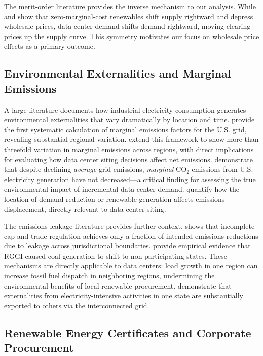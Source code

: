 \documentclass[a4paper,fleqn,longmktitle]{cas-sc}
\begin{document}
The merit-order literature provides the inverse mechanism to our analysis. While \citet{sensfuss2008} and \citet{cludius2014} show that zero-marginal-cost renewables shift supply rightward and depress wholesale prices, data center demand shifts demand rightward, moving clearing prices up the supply curve. This symmetry motivates our focus on wholesale price effects as a primary outcome.
 
\subsection{Environmental Externalities and Marginal Emissions}
 
A large literature documents how industrial electricity consumption generates environmental externalities that vary dramatically by location and time. \citet{siler_evans2012} provide the first systematic calculation of marginal emissions factors for the U.S. grid, revealing substantial regional variation. \citet{graff_zivin2014} extend this framework to show more than threefold variation in marginal emissions across regions, with direct implications for evaluating how data center siting decisions affect net emissions. \citet{holland2022pnas} demonstrate that despite declining \emph{average} grid emissions, \emph{marginal} CO$_2$ emissions from U.S. electricity generation have not decreased---a critical finding for assessing the true environmental impact of incremental data center demand. \citet{callaway_fowlie2018} quantify how the location of demand reduction or renewable generation affects emissions displacement, directly relevant to data center siting.
 
The emissions leakage literature provides further context. \citet{fowlie2009} shows that incomplete cap-and-trade regulation achieves only a fraction of intended emissions reductions due to leakage across jurisdictional boundaries. \citet{fell_maniloff2018} provide empirical evidence that RGGI caused coal generation to shift to non-participating states. These mechanisms are directly applicable to data centers: load growth in one region can increase fossil fuel dispatch in neighboring regions, undermining the environmental benefits of local renewable procurement. \citet{holland2016aer} demonstrate that externalities from electricity-intensive activities in one state are substantially exported to others via the interconnected grid.
 
\subsection{Renewable Energy Certificates and Corporate Procurement}
 
\end{document}
